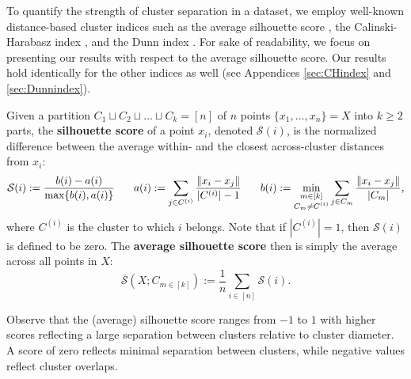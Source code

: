 To quantify the strength of cluster separation %
in a dataset, we employ well-known distance-based cluster indices such as the average silhouette score \citep{rousseeuw1987silhouettes}, the Calinski-Harabasz index \citep{Caliński01011974}, and the Dunn index \citep{DunnIndex1974}. 
For sake of readability, we focus on presenting our results with respect to the average silhouette score. Our results hold identically for the other indices as well (see Appendices \ref{sec:CHindex} and \ref{sec:Dunnindex}). 




\begin{definition}
    Given a partition $C_1 \sqcup C_2 \sqcup \dots \sqcup C_k = [n]$ of $n$ points $\{x_1,\ldots,x_n\} = X$ into $k \geq 2$ parts, the \textbf{silhouette score} of a point $x_i$, denoted \(\mathcal{S}(i)\), is the normalized difference between the average within- and the closest across-cluster distances from $x_i$: 
$$
\mathcal{S}(i) := \frac{b(i)-a(i)}{\max \{b(i),a(i)\}} 
\hspace{0.25in}
a(i) := \sum_{j \in C^{(i)}} \frac{\lVert x_i - x_j \rVert}{|C^{(i)}|-1} 
\hspace{0.25in}
b(i) := \min_{
\substack{m \in [k] \\ C_m \neq C^{(i)}}} \sum_{j \in C_m} \frac{\lVert x_i - x_j \rVert}{|C_m|},
$$
where $C^{(i)}$ is the cluster to which $i$ belongs. Note that if $|C^{(i)}|=1$, then $\mathcal{S}(i)$ is defined to be zero.
The \textbf{average silhouette score} then is simply the average across all points in $X$:
$$\bar{\mathcal{S}}(X; C_{m\in[k]}) := \frac{1}{n} \sum_{i \in [n]} \mathcal{S}(i).$$
\end{definition}
Observe that the (average) silhouette score ranges from $-1$ to $1$ with higher scores reflecting a large separation between clusters relative to cluster diameter. A score of zero reflects minimal separation between clusters, while negative values reflect cluster overlaps.

